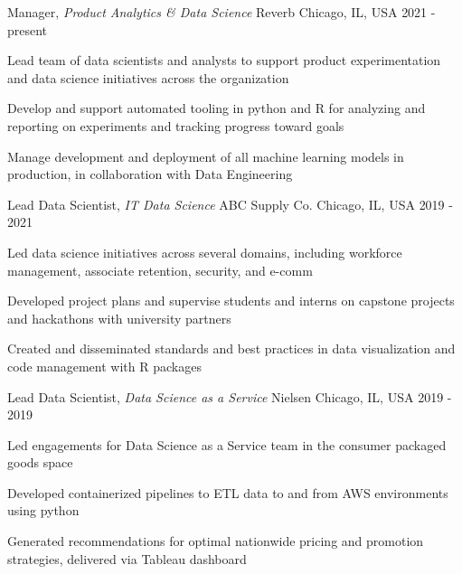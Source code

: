 
\begin{cventries}

  \cventry
    {Manager, \textit{Product Analytics \& Data Science}} %
    {Reverb} %
    {Chicago, IL, USA} %
    {2021 - present} %
    {
      \begin{cvitems}
        \item {Lead team of data scientists and analysts to support product experimentation and data science initiatives across the organization}
        \item {Develop and support automated tooling in python and R for analyzing and reporting on experiments and tracking progress toward goals}
        \item {Manage development and deployment of all machine learning models in production, in collaboration with Data Engineering}        
      \end{cvitems}
    }

  \cventry
    {Lead Data Scientist, \textit{IT Data Science}} %
    {ABC Supply Co.} %
    {Chicago, IL, USA} %
    {2019 - 2021} %
    {
      \begin{cvitems}
        \item {Led data science initiatives across several domains, including workforce management, associate retention, security, and e-comm}
        \item {Developed project plans and supervise students and interns on capstone projects and hackathons with university partners}
        \item {Created and disseminated standards and best practices in data visualization and code management with R packages}
      \end{cvitems}
    }

 \cventry
    {Lead Data Scientist, \textit{Data Science as a Service}} %
    {Nielsen} %
    {Chicago, IL, USA} %
    {2019 - 2019} %
    {
      \begin{cvitems}
        \item {Led engagements for Data Science as a Service team in the consumer packaged goods space}
        \item {Developed containerized pipelines to ETL data to and from AWS environments using python}
        \item {Generated recommendations for optimal nationwide pricing and promotion strategies, delivered via Tableau dashboard}
      \end{cvitems}
    }


\end{cventries}
